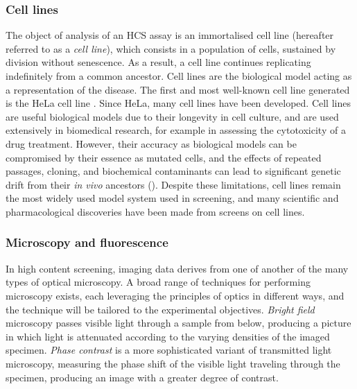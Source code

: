 \subsubsection{Cell lines}

The object of analysis of an HCS assay is an immortalised cell line (hereafter referred to as a \emph{cell line}), which consists in a population of cells, sustained by division without senescence. As a result, a cell line continues replicating indefinitely from a common ancestor. Cell lines are the biological model acting as a representation of the disease. The first and most well-known cell line generated is the HeLa cell line \cite{scherer1953studies}. Since HeLa, many cell lines have been developed. Cell lines are useful biological models due to their longevity in cell culture, and are used extensively in biomedical research, for example in assessing the cytotoxicity of a drug treatment. However, their accuracy as biological models can be compromised by their essence as mutated cells, and the effects of repeated passages, cloning, and biochemical contaminants can lead to significant genetic drift from their \emph{in vivo} ancestors (\cite{marx2014cell}). Despite these limitations, cell lines remain the most widely used model system used in screening, and many scientific and pharmacological discoveries have been made from screens on cell lines.

\subsubsection{Microscopy and fluorescence}

In high content screening, imaging data derives from one of another of the many types of optical microscopy. A broad range of techniques for performing microscopy exists, each leveraging the principles of optics in different ways, and the technique will be tailored to the experimental objectives. \emph{Bright field} microscopy passes visible light through a sample from below, producing a picture in which light is attenuated according to the varying densities of the imaged specimen. \emph{Phase contrast} is a more sophisticated variant of transmitted light microscopy, measuring the phase shift of the visible light traveling through the specimen, producing an image with a greater degree of contrast.

